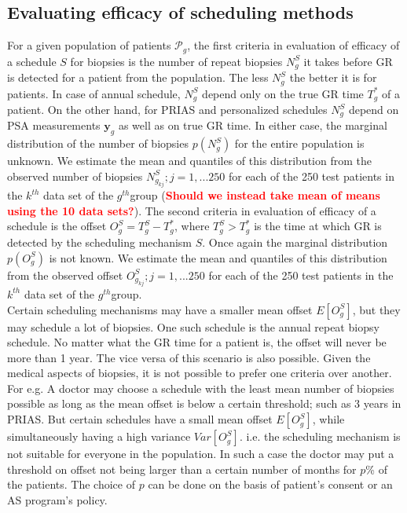 \subsection{Evaluating efficacy of scheduling methods}
For a given population of patients $\mathcal{P}_g$, the first criteria in evaluation of efficacy of a schedule $S$ for biopsies is the number of repeat biopsies $N^S_g$ it takes before GR is detected for a patient from the population. The less $N^S_g$ the better it is for patients. In case of annual schedule, $N^S_g$ depend only on the true GR time $T^*_g$ of a patient. On the other hand, for PRIAS and personalized schedules $N^S_g$ depend on PSA measurements $\boldsymbol{y}_g$ as well as on true GR time. In either case, the marginal distribution of the number of biopsies $p(N^S_g)$ for the entire population is unknown. We estimate the mean and quantiles of this distribution from the observed number of biopsies $N^S_{g_{kj}}; j=1,...250$ for each of the 250 test patients in the $k^{th}$ data set of the $g^{th}$group (\textcolor{red}{\textbf{Should we instead take mean of means using the 10 data sets?}}). The second criteria in evaluation of efficacy of a schedule is the offset $O^S_g = T^S_g - T^*_g$, where $T^S_g > T^*_g$ is the time at which GR is detected by the scheduling mechanism $S$. Once again the marginal distribution $p(O^S_g)$ is not known. We estimate the mean and quantiles of this distribution from the observed offset $O^S_{g_{kj}}; j=1,...250$ for each of the 250 test patients in the $k^{th}$ data set of the $g^{th}$group.\\

Certain scheduling mechanisms may have a smaller mean offset $E[O^S_g]$, but they may schedule a lot of biopsies. One such schedule is the annual repeat biopsy schedule. No matter what the GR time for a patient is, the offset will never be more than 1 year. The vice versa of this scenario is also possible. Given the medical aspects of biopsies, it is not possible to prefer one criteria over another. For e.g. A doctor may choose a schedule with the least mean number of biopsies possible as long as the mean offset is below a certain threshold; such as 3 years in PRIAS. But certain schedules have a small mean offset $E[O^S_g]$, while simultaneously having a high variance $Var[O^S_g]$. i.e. the scheduling mechanism is not suitable for everyone in the population. In such a case the doctor may put a threshold on offset not being larger than a certain number of months for $p$\% of the patients. The choice of $p$ can be done on the basis of patient's consent or an AS program's policy.

